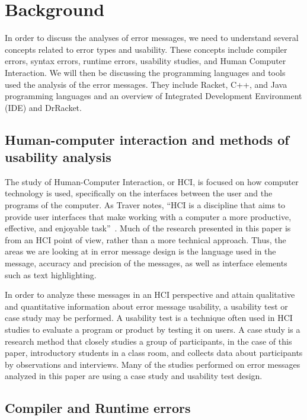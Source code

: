 \documentclass{sig-alternate}
\begin{document}
\section{Background}\label{sec:background}
In order to discuss the analyses of error messages, we need to understand several concepts related to error types and usability.
These concepts include compiler errors, syntax errors, runtime errors, usability studies, and Human Computer Interaction.
We will then be discussing the programming languages and tools used the analysis of the error messages.
They include Racket, C++, and Java programming languages and an overview of Integrated Development Environment (IDE) and DrRacket. 


\subsection{Human-computer interaction and methods of usability analysis}\label{subsec:hci}

The study of Human-Computer Interaction, or HCI, is focused on how computer technology is used, specifically on the interfaces between the user and the programs of the computer.
As Traver notes, ``HCI is a discipline that aims to provide user interfaces that make working with a computer a more productive, effective, and enjoyable task''~\cite{Traver:2010}.
Much of the research presented in this paper is from an HCI point of view, rather than a more technical approach.
Thus, the areas we are looking at in error message design is the language used in the message, accuracy and precision of the messages, as well as interface elements such as text highlighting.

In order to analyze these messages in an HCI perspective and attain qualitative and quantitative information about error message usability, a usability test or case study may be performed.
A usability test is a technique often used in HCI studies to evaluate a program or product by testing it on users.
A case study is a research method that closely studies a group of participants, in the case of this paper, introductory students in a class room, and collects data about participants by observations and interviews.
Many of the studies performed on error messages analyzed in this paper are using a case study and usability test design. 

\subsection{Compiler and Runtime errors}\label{subsec:error types}
\end{document}
